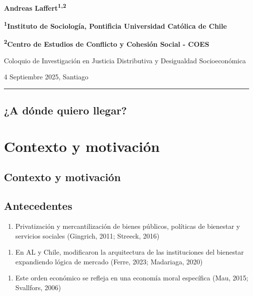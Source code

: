 \documentclass[
  spanish,
  letterpaper,
  DIV=11,
  numbers=noendperiod,
  oneside]{scrartcl}
\providecommand{\tightlist}{%
  \setlength{\itemsep}{0pt}\setlength{\parskip}{0pt}}
\begin{document}
\textbf{Andreas Laffert\textsuperscript{1,2}}

\textbf{\textsuperscript{1}Instituto de Sociología, Pontificia
Universidad Católica de Chile}

\textbf{\textsuperscript{2}Centro de Estudios de Conflicto y Cohesión
Social - COES}

Coloquio de Investigación en Justicia Distributiva y Desigualdad
Socioeconómica

4 Septiembre 2025, Santiago

\begin{center}\rule{0.5\linewidth}{0.5pt}\end{center}

\subsection{¿A dónde quiero llegar?}\label{a-duxf3nde-quiero-llegar}

\section{Contexto y motivación}\label{contexto-y-motivaciuxf3n}

\subsection{Contexto y motivación}\label{contexto-y-motivaciuxf3n-1}

\subsection{Antecedentes}\label{antecedentes}

\begin{enumerate}
\def\labelenumi{\arabic{enumi})}
\tightlist
\item
  Privatización y mercantilización de bienes públicos, políticas de
  bienestar y servicios sociales (Gingrich, 2011; Streeck, 2016)
\end{enumerate}

\begin{enumerate}
\def\labelenumi{\arabic{enumi})}
\setcounter{enumi}{1}
\tightlist
\item
  En AL y Chile, modificaron la arquitectura de las instituciones del
  bienestar expandiendo lógica de mercado (Ferre, 2023; Madariaga, 2020)
\end{enumerate}

\begin{enumerate}
\def\labelenumi{\arabic{enumi})}
\setcounter{enumi}{2}
\tightlist
\item
  Este orden económico se refleja en una economía moral específica (Mau,
  2015; Svallfors, 2006)
\end{enumerate}
\end{document}
